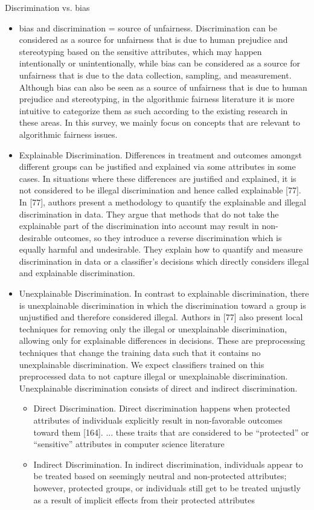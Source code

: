 \documentclass[12pt, a4paper, oneside]{book}   	%
\begin{document}
			Discrimination vs. bias
			\begin{itemize}
				\item bias and discrimination = source of unfairness. Discrimination can be considered as a source for unfairness that is due to human prejudice and stereotyping based on the sensitive attributes, which may happen intentionally or unintentionally, while bias can be considered as a source for unfairness that is due to the data collection, sampling, and measurement. Although bias can also be seen as a source of unfairness that is due to human prejudice and stereotyping, in the algorithmic fairness literature it is more intuitive to categorize them as such according to the existing research in these areas. In this survey, we mainly focus on concepts that are relevant to algorithmic fairness issues. \autocite{Mehrabi_2021}
				\item Explainable Discrimination. Differences in treatment and outcomes amongst different groups can be justified and explained via some attributes in some cases. In situations where these differences are justified and explained, it is not considered to be illegal discrimination and hence called explainable [77]. In [77], authors present a methodology to quantify the explainable and illegal discrimination in data. They argue that methods that do not take the explainable part of the discrimination into account may result in non-desirable outcomes, so they introduce a reverse discrimination which is equally harmful and undesirable. They explain how to quantify and measure discrimination in data or a classifier’s decisions which directly considers illegal and explainable discrimination.\autocite{Mehrabi_2021}
				\item Unexplainable Discrimination. In contrast to explainable discrimination, there is unexplainable discrimination in which the discrimination toward a group is unjustified and therefore considered illegal. Authors in [77] also present local techniques for removing only the illegal or unexplainable discrimination, allowing only for explainable differences in decisions. These are preprocessing techniques that change the training data such that it contains no unexplainable discrimination. We expect classifiers trained on this preprocessed data to not capture illegal or unexplainable discrimination. Unexplainable discrimination consists of direct and indirect discrimination.\autocite{Mehrabi_2021}
				\begin{itemize}
					\item Direct Discrimination. Direct discrimination happens when protected attributes of individuals explicitly result in non-favorable outcomes toward them [164]. ... these traits that are considered to be “protected” or “sensitive” attributes in computer science literature  \autocite{Mehrabi_2021}
					\item Indirect Discrimination. In indirect discrimination, individuals appear to be treated based on seemingly neutral and non-protected attributes; however, protected groups, or individuals still get to be treated unjustly as a result of implicit effects from their protected attributes \autocite{Mehrabi_2021}
				\end{itemize}
			\end{itemize}
			
\end{document}
